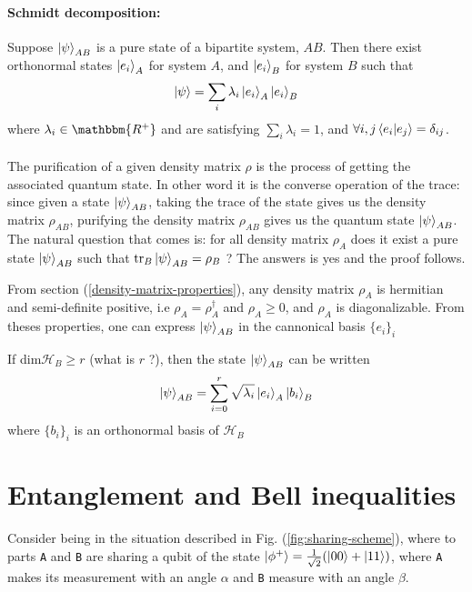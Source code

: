 \documentclass{article}
\begin{document}
\paragraph{Schmidt decomposition: }
Suppose $\ket{\psi}_{AB}$ is a pure state of a bipartite system, $AB$. Then
there exist orthonormal states $\ket{e_i}_A$ for system $A$, and $\ket{e_i}_B$
for system $B$ such that
\begin{equation}
    \ket{\psi} = \sum_i\lambda_i \ket{e_i}_A \ket{e_i}_B
\end{equation}
where $\lambda_i \in \mathbbm{R^+}$ and are satisfying $\sum_i\lambda_i=1$, and
$\forall i,j \braket{e_i|e_j}=\delta_{ij}$.
\\ \\
The purification of a given density matrix $\rho$ is the process of getting the
associated quantum state. In other word it is the converse operation of the
trace: since given a state $\ket{\psi}_{AB}$, taking the trace of the state
gives us the density matrix $\rho_{AB}$, purifying the density matrix
$\rho_{AB}$ gives us the quantum state $\ket{\psi}_{AB}$.\\
The natural question that comes is: for all density matrix $\rho_A$ does it
exist a pure state $\ket{\psi}_{AB}$ such that $\text{tr}_B\ket{\psi}_{AB} =
\rho_B$ ? The answers is yes and the proof follows.

From section (\ref{density-matrix-properties}), any density matrix $\rho_A$ is
hermitian and semi-definite positive, i.e $\rho_A=\rho^\dagger_A$ and $\rho_A
\geq 0$, and $\rho_A$ is diagonalizable. From theses properties, one can express
$\ket{\psi}_{AB}$ in the cannonical basis $\{e_i\}_i$

If dim$\mathscr{H}_B \geq r$ (what is $r$ ?), then the state $\ket{\psi}_{AB}$
can be written
\begin{equation}
    \ket{\psi}_{AB} = \sum_{i=0}^r \sqrt{\lambda_i} \ket{e_i}_A\ket{b_i}_B
\end{equation}
where $\{b_i\}_i$ is an orthonormal basis of $\mathscr{H}_B$

\section{Entanglement and Bell inequalities}

Consider being in the situation described in Fig. (\ref{fig:sharing-scheme}),
where to parts \texttt{A} and \texttt{B} are sharing a qubit of the state
$\ket{\phi^+}=\frac{1}{\sqrt{2}}(\ket{00} + \ket{11})$, where \texttt{A}
makes its measurement with an angle $\alpha$ and \texttt{B} measure
with an angle $\texttt{$\beta$}$.
\end{document}
